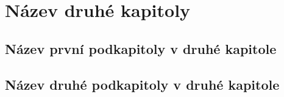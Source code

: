 \chapter{Název druhé kapitoly}

\section{Název první podkapitoly v druhé kapitole}

\section{Název druhé podkapitoly v druhé kapitole}

